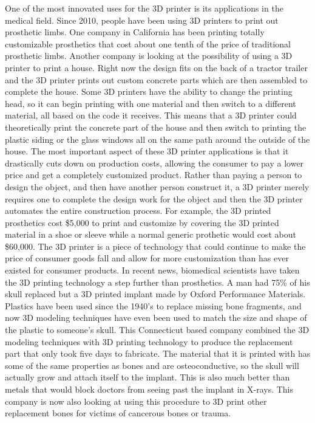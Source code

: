 \documentclass[12pt,twocolumn]{article}
\begin{document}
\indent	One of the most innovated uses for the 3D printer is its applications in the medical field. Since 2010, people have been using 3D printers to print out prosthetic limbs. One company in California has been printing totally customizable prosthetics that cost about one tenth of the price of traditional prosthetic limbs. Another company is looking at the possibility of using a 3D printer to print a house. Right now the design fits on the back of a tractor trailer and the 3D printer prints out custom concrete parts which are then assembled to complete the house. Some 3D printers have the ability to change the printing head, so it can begin printing with one material and then switch to a different material, all based on the code it receives. This means that a 3D printer could theoretically print the concrete part of the house and then switch to printing the plastic siding or the glass windows all on the same path around the outside of the house. The most important aspect of these 3D printer applications is that it drastically cuts down on production costs, allowing the consumer to pay a lower price and get a completely customized product. Rather than paying a person to design the object, and then have another person construct it, a 3D printer merely requires one to complete the design work for the object and then the 3D printer automates the entire construction process. For example, the 3D printed prosthetics cost \$5,000 to print and customize by covering the 3D printed material in a shoe or sleeve while a normal generic prothetic would cost about \$60,000.\cite{cite5} The 3D printer is a piece of technology that could continue to make the price of consumer goods fall and allow for more customization than has ever existed for consumer products.
 \indent In recent news, biomedical scientists have taken the 3D printing technology a step further than prosthetics. A man had 75\% of his skull replaced but a 3D printed implant made by Oxford Performance Materials. Plastics have been used since the 1940's to replace missing bone fragments, and now 3D modeling techniques have even been used to match the size and shape of the plastic to someone's skull. This Connecticut based company combined the 3D modeling techniques with 3D printing technology to produce the replacement part that only took five days to fabricate.\cite{cite9} The material that it is printed with has some of the same properties as bones and are osteoconductive, so the skull will actually grow and attach itself to the implant. This is also much better than metals that would block doctors from seeing past the implant in X-rays. This company is now also looking at using this procedure to 3D print other replacement bones for victims of cancerous bones or trauma. \\
\end{document}
